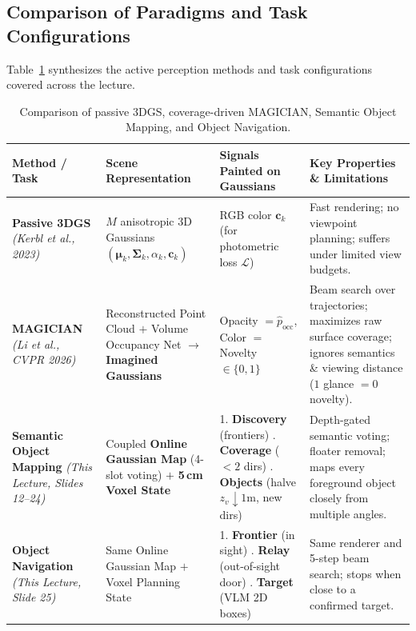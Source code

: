 \documentclass[11pt, a4paper]{article}
\theoremstyle{definition}
\begin{document}
\subsection{Comparison of Paradigms and Task Configurations}

Table~\ref{tab:comparison} synthesizes the active perception methods and task configurations covered across the lecture.

\begin{table}[htbp]
\centering
\small
\renewcommand{\arraystretch}{1.35}
\begin{tabular}{p{3.0cm} p{3.4cm} p{3.6cm} p{4.0cm}}
\toprule
\textbf{Method / Task} & \textbf{Scene Representation} & \textbf{Signals Painted on Gaussians} & \textbf{Key Properties \& Limitations} \\
\midrule
\textbf{Passive 3DGS} \newline \emph{(Kerbl et al., 2023)} & $M$ anisotropic 3D Gaussians $(\boldsymbol{\mu}_k, \boldsymbol{\Sigma}_k, \alpha_k, \mathbf{c}_k)$ & RGB color $\mathbf{c}_k$ (for photometric loss $\mathcal{L}$) & Fast rendering; no viewpoint planning; suffers under limited view budgets. \\
\addlinespace[3pt]
\textbf{MAGICIAN} \newline \emph{(Li et al., CVPR 2026)} & Reconstructed Point Cloud $+$ Volume Occupancy Net $\to$ \textbf{Imagined Gaussians} & Opacity $= \hat{p}_{\text{occ}}$, \newline Color $=$ Novelty $\in \{0,1\}$ & Beam search over trajectories; maximizes raw surface coverage; ignores semantics \& viewing distance ($1$ glance $= 0$ novelty). \\
\addlinespace[3pt]
\textbf{Semantic Object Mapping} \newline \emph{(This Lecture, Slides 12--24)} & Coupled \textbf{Online Gaussian Map} (4-slot voting) $+$ \textbf{5\,cm Voxel State} & 1. \textbf{Discovery} (frontiers) \newline 2. \textbf{Coverage} ($<2$ dirs) \newline 3. \textbf{Objects} (halve $z_v \downarrow 1\text{m}$, new dirs) & Depth-gated semantic voting; floater removal; maps every foreground object closely from multiple angles. \\
\addlinespace[3pt]
\textbf{Object Navigation} \newline \emph{(This Lecture, Slide 25)} & Same Online Gaussian Map $+$ Voxel Planning State & 1. \textbf{Frontier} (in sight) \newline 2. \textbf{Relay} (out-of-sight door) \newline 3. \textbf{Target} (VLM 2D boxes) & Same renderer and 5-step beam search; stops when close to a confirmed target. \\
\bottomrule
\end{tabular}
\caption{Comparison of passive 3DGS, coverage-driven MAGICIAN, Semantic Object Mapping, and Object Navigation.}
\label{tab:comparison}
\end{table}
\end{document}
